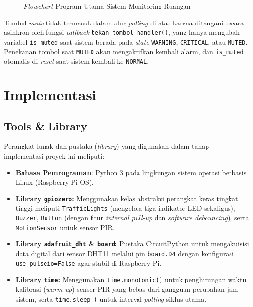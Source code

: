 \documentclass[12pt, a4paper]{article}
\begin{document}
\begin{figure}[p]
{%
}
\caption{\textit{Flowchart} Program Utama Sistem Monitoring Ruangan}
\label{fig:flowchart}
\end{figure}

Tombol \textit{mute} tidak termasuk dalam alur \textit{polling} di atas karena ditangani secara asinkron oleh fungsi \textit{callback} \texttt{tekan\_tombol\_handler()}, yang hanya mengubah variabel \texttt{is\_muted} saat sistem berada pada \textit{state} \texttt{WARNING}, \texttt{CRITICAL}, atau \texttt{MUTED}. Penekanan tombol saat \texttt{MUTED} akan mengaktifkan kembali alarm, dan \texttt{is\_muted} otomatis di-\textit{reset} saat sistem kembali ke \texttt{NORMAL}.

\section{Implementasi}
\subsection{Tools \& Library}
Perangkat lunak dan pustaka (\textit{library}) yang digunakan dalam tahap implementasi proyek ini meliputi:
\begin{itemize}
    \item \textbf{Bahasa Pemrograman:} Python 3 pada lingkungan sistem operasi berbasis Linux (Raspberry Pi OS).
    \item \textbf{Library \texttt{gpiozero}:} Menggunakan kelas abstraksi perangkat keras tingkat tinggi meliputi 
    \texttt{TrafficLights} (mengelola tiga indikator LED sekaligus), \texttt{Buzzer}, \texttt{Button} (dengan fitur 
    \textit{internal pull-up} dan \textit{software debouncing}), serta \texttt{MotionSensor} untuk sensor PIR.
    \item \textbf{Library \texttt{adafruit\_dht} \& \texttt{board}:} Pustaka CircuitPython untuk mengakuisisi data 
    digital dari sensor DHT11 melalui pin \texttt{board.D4} dengan konfigurasi \texttt{use\_pulseio=False} agar stabil di 
    Raspberry Pi.
    \item \textbf{Library \texttt{time}:} Menggunakan \texttt{time.monotonic()} untuk penghitungan waktu kalibrasi 
    (\textit{warm-up}) sensor PIR yang bebas dari gangguan perubahan jam sistem, serta \texttt{time.sleep()} untuk interval 
    \textit{polling} siklus utama.
\end{itemize}
\end{document}

